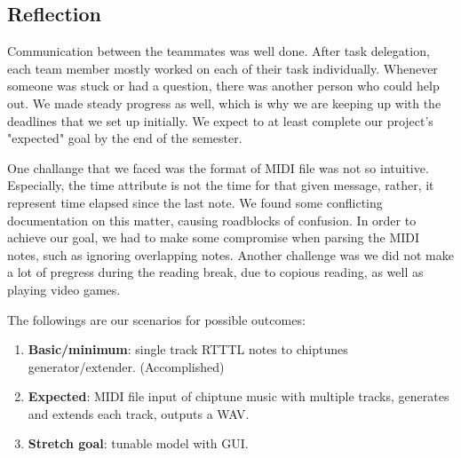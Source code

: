 \documentclass{article}
\begin{document}
\subsection{Reflection}
Communication between the teammates was well done. After task delegation, each team member mostly worked on each of their task individually. Whenever someone was stuck or had 
a question, there was another person who could help out. We made steady progress as well, which is why we are keeping up with the deadlines that we set up initially. We expect 
to at least complete our project's "expected" goal by the end of the semester.

One challange that we faced was the format of MIDI file was not so intuitive. Especially, the time attribute is not the time for that given message, rather, it represent
time elapsed since the last note. We found some conflicting documentation on this matter, causing roadblocks of confusion. In order to achieve our goal, we had to make some 
compromise when parsing the MIDI notes, such as ignoring overlapping notes. Another challenge was we did not make a lot of pregress during the reading break, due to 
copious reading, as well as playing video games.

The followings are our scenarios for possible outcomes:
\begin{enumerate}
  \item \textbf{Basic/minimum}: single track RTTTL notes to chiptunes generator/extender. (Accomplished)
  \item \textbf{Expected}: MIDI file input of chiptune music with multiple tracks, generates and extends each track, outputs a WAV.
  \item \textbf{Stretch goal}: tunable model with GUI.
\end{enumerate}



\end{document}
